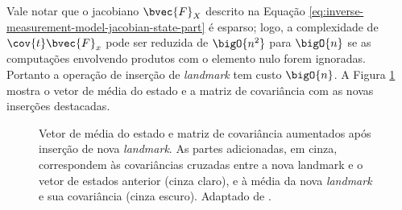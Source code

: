 Vale notar que o jacobiano $\bvec{F}_X$ descrito na Equação \ref{eq:inverse-measurement-model-jacobian-state-part} é esparso; logo, a complexidade de $\cov{t}\bvec{F}_x$ pode ser reduzida de $\bigO{n^2}$ para $\bigO{n}$ se as computações envolvendo produtos com o elemento nulo forem ignoradas. Portanto a operação de inserção de \textit{landmark} tem custo $\bigO{n}$. A Figura \ref{fig:ekf-slam-landmark-insertion} mostra o vetor de média do estado e a matriz de covariância com as novas inserções destacadas.

\begin{figure}[h]
  \centering
  
  \caption{Vetor de média do estado e matriz de covariância aumentados após inserção de nova \textit{landmark}. As partes adicionadas, em cinza, correspondem às covariâncias cruzadas entre a nova landmark e o vetor de estados anterior (cinza claro), e à média da nova \textit{landmark} e sua covariância (cinza escuro). Adaptado de \cite[p.~11]{jsola}.}
  \label{fig:ekf-slam-landmark-insertion}
\end{figure}

